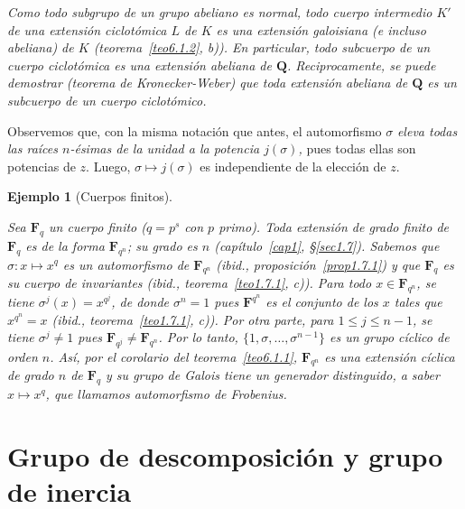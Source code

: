 \documentclass[oneside,bibtotoc,leqno,spanish]{amsbook}
\newcommand{\QQ}{\mathbf{Q}}
\newcommand{\FF}{\mathbf{F}}
\numberwithin{equation}{section}
\newenvironment{comm}%
	{\begin{trivlist}\item\small\itshape}
	{\end{trivlist}}
\theoremstyle{defi}
\theoremstyle{note}
\theoremstyle{rem}
\newtheorem{example}{Ejemplo}
\numberwithin{theorem}{section}
\numberwithin{proposition}{section}
\numberwithin{definition}{section}
\numberwithin{lemma}{section}
\numberwithin{corollary}{section}
\numberwithin{example}{section}
\numberwithin{footnote}{section}%
\begin{document}
\begin{comm}
Como todo subgrupo de un grupo abeliano es normal, todo cuerpo intermedio $K'$ de
una extensi\'on ciclot\'omica
$L$ de $K$ es una extensi\'on galoisiana (e incluso abeliana) de $K$
(teorema~\ref{teo6.1.2}, {\itshape b})). En particular, todo
subcuerpo de un cuerpo ciclot\'omica es una extensi\'on abeliana de $\QQ$. Reciprocamente,
se puede
demostrar (teorema de Kronecker-Weber) que toda extensi\'on abeliana de $\QQ$ es un
subcuerpo de un cuerpo ciclot\'omico.
\end{comm}

Observemos que, con la misma notaci\'on que antes, el automorfismo $\sigma$ {\em eleva
todas las ra\'ices
$n$-\'esimas de la unidad a la potencia $j(\sigma)$,} pues todas ellas son potencias
de $z$. Luego, $\sigma\mapsto j(\sigma)$ es independiente de la elecci\'on de $z$.

\begin{example}[Cuerpos finitos]\label{ej6.1.3}


Sea $\FF_{q}$ un cuerpo {\em finito} ($q = p^{s}$ con $p$ primo). Toda extensi\'on de grado finito de $\FF_{q}$
es de la forma $\FF_{q^{n}}$; su grado es $n$ (cap\'itulo~\ref{cap1}, \S\ref{sec1.7}). Sabemos que
$\sigma:x\mapsto x^{q}$ es un automorfismo de $\FF_{q^{n}}$ ({\itshape ibid.}, proposici\'on~\ref{prop1.7.1}) y que
$\FF_{q}$ es su cuerpo de invariantes ({\itshape ibid.}, teorema~\ref{teo1.7.1}, {\itshape c})). Para todo $x\in\FF_{q^{n}}$,
se tiene $\sigma^{j}(x) = x^{q^{j}}$, de donde $\sigma^{n}=1$ pues $\FF^{q^{n}}$ es el conjunto de los
$x$ tales que $x^{q^{n}}=x$ ({\itshape ibid.},
teorema~\ref{teo1.7.1}, {\itshape c})). Por otra parte, para
$1\leq j\leq n-1$, se tiene $\sigma^{j}\neq 1$ pues $\FF_{q^{j}}\neq\FF_{q^{n}}$. Por lo tanto,
$\{1,\sigma,\dots,\sigma^{n-1}\}$ es un grupo c\'iclico de orden $n$. As\'i, por el corolario 
del teorema~\ref{teo6.1.1}, $\FF_{q^{n}}$
{\em es una extensi\'on c\'iclica de grado $n$ de $\FF_{q}$ y su grupo de Galois tiene un generador
distinguido, a saber $x\mapsto x^{q}$, que llamamos automorfismo de Frobenius.}
\end{example}

\section{Grupo de descomposici\'on y grupo de inercia}\label{sec6.2}
\end{document}
